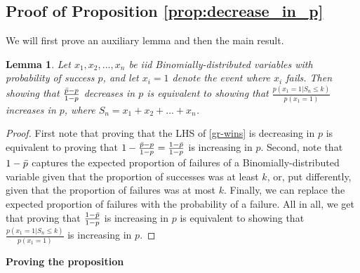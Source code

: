 \documentclass[12pt,a4paper]{article}
\newtheorem{lemma}{Lemma}
\begin{document}
\subsection{Proof of Proposition \ref{prop:decrease_in_p}}
We will first prove an auxiliary lemma and then the main result.
\begin{lemma}
\label{lemma:eqiv_formulation}
Let $x_1,x_2,...,x_n$ be iid Binomially-distributed variables with probability of success $p$, and let $x_i=1$ denote the event where $x_i$ fails. Then showing that $\frac{ \bar{p} - p}{ 1 - p}$ decreases in $p$ is equivalent to showing that $\frac{p(x_1=1|S_n \leq k)}{p(x_1=1)}$ increases in $p$, where $S_n=x_1+x_2+...+x_n$.
\end{lemma}
\begin{proof}
First note that proving that the LHS of \eqref{gr-wins} is decreasing in $p$ is equivalent to proving that $1-\frac{ \bar{p} - p}{ 1 - p} = \frac{ 1- \bar{p}}{ 1 - p}$ is increasing in $p$. Second, note that 
$1- \bar{p}$ captures the expected proportion of failures of a Binomially-distributed variable given that the proportion of successes was at least $k$, or, put differently, given that the proportion of failures was at most $k$. Finally, we can replace the expected proportion of failures with the probability of a failure. All in all, we get that proving that $\frac{ 1- \bar{p}}{ 1 - p}$ is increasing in $p$ is equivalent to showing that $\frac{p(x_1=1|S_n \leq k)}{p(x_1=1)}$ is increasing in $p$.
\end{proof}
\vspace{0.3cm}

\noindent \textbf{Proving the proposition}
\vspace{0.3cm}
\end{document}
